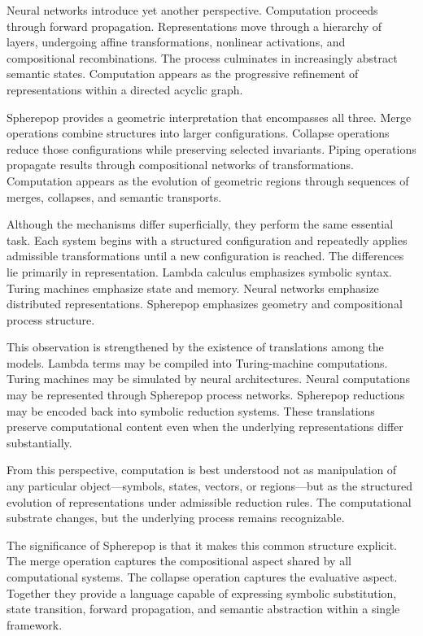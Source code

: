 \documentclass[12pt,letterpaper]{article}
\theoremstyle{remark}
\begin{document}
Neural networks introduce yet another perspective. Computation proceeds through forward propagation. Representations move through a hierarchy of layers, undergoing affine transformations, nonlinear activations, and compositional recombinations. The process culminates in increasingly abstract semantic states. Computation appears as the progressive refinement of representations within a directed acyclic graph.

Spherepop provides a geometric interpretation that encompasses all three. Merge operations combine structures into larger configurations. Collapse operations reduce those configurations while preserving selected invariants. Piping operations propagate results through compositional networks of transformations. Computation appears as the evolution of geometric regions through sequences of merges, collapses, and semantic transports.

Although the mechanisms differ superficially, they perform the same essential task. Each system begins with a structured configuration and repeatedly applies admissible transformations until a new configuration is reached. The differences lie primarily in representation. Lambda calculus emphasizes symbolic syntax. Turing machines emphasize state and memory. Neural networks emphasize distributed representations. Spherepop emphasizes geometry and compositional process structure.

This observation is strengthened by the existence of translations among the models. Lambda terms may be compiled into Turing-machine computations. Turing machines may be simulated by neural architectures. Neural computations may be represented through Spherepop process networks. Spherepop reductions may be encoded back into symbolic reduction systems. These translations preserve computational content even when the underlying representations differ substantially.

From this perspective, computation is best understood not as manipulation of any particular object—symbols, states, vectors, or regions—but as the structured evolution of representations under admissible reduction rules. The computational substrate changes, but the underlying process remains recognizable.

The significance of Spherepop is that it makes this common structure explicit. The merge operation captures the compositional aspect shared by all computational systems. The collapse operation captures the evaluative aspect. Together they provide a language capable of expressing symbolic substitution, state transition, forward propagation, and semantic abstraction within a single framework.
\end{document}
